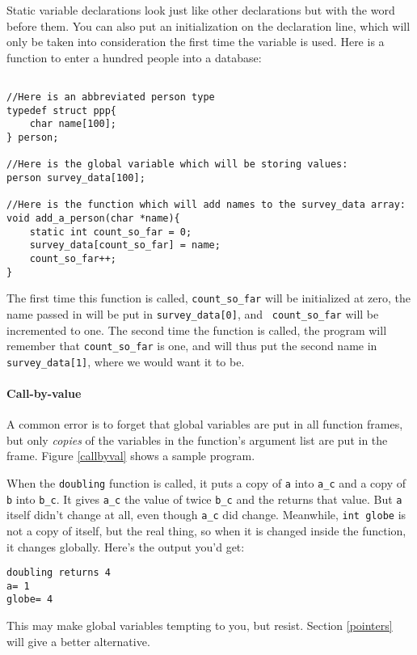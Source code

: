 \documentclass[12pt]{article}
\makeatletter
\def\ttind#1{\index{#1@{\tt #1}}{\tt #1}}
\makeatother
\begin{document}
Static variable declarations look just like other declarations but with
the word \ttind{static} before them. You can also put an initialization on
the declaration line, which will only be taken into consideration the
first time the variable is used. Here is a function to enter a hundred
people into a database:
\begin{verbatim}

//Here is an abbreviated person type
typedef struct ppp{
    char name[100];
} person;

//Here is the global variable which will be storing values:
person survey_data[100];

//Here is the function which will add names to the survey_data array:
void add_a_person(char *name){
    static int count_so_far = 0;
    survey_data[count_so_far] = name;
    count_so_far++;
}
\end{verbatim}

The first time this function is called, {\tt count\_so\_far} will be initialized
at zero, the name passed in will be put in {\tt survey\_data[0]}, and {\tt
count\_so\_far} will be incremented to one. The second time the function is
called, the program will remember that {\tt count\_so\_far} is one, and will thus
put the second name in {\tt survey\_data[1]}, where we would want it to be.


\paragraph{Call-by-value} 
A common error is to forget that global variables are put in all function frames,
but only {\sl copies} of the variables in the function's
argument list are put in the frame.  Figure \ref{callbyval} shows a sample program.


When the {\tt doubling} function is called, it puts a copy of {\tt a} into {\tt a\_c} and a copy of {\tt b}
into {\tt b\_c}. It gives {\tt a\_c} the value of twice {\tt b\_c} and the returns that value. But {\tt a}
itself didn't change at all, even though {\tt a\_c} did change. Meanwhile, {\tt int globe} is not a copy of
itself, but the real thing, so when it is changed inside the function, it changes globally.
Here's the output you'd get:
\begin{verbatim}
doubling returns 4
a= 1
globe= 4
\end{verbatim}

This may make global variables tempting to you, but resist. Section \ref{pointers} will give a better
alternative.
\end{document}
